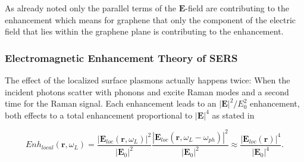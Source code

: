As already noted only the parallel terms of the $\mathbf{E}$-field are contributing to the enhancement which means for graphene that only the component of the electric field that lies within the graphene plane is contributing to the enhancement.

\subsubsection{Electromagnetic Enhancement Theory of SERS}

The effect of the localized surface plasmons actually happens twice: When the incident photons scatter with phonons and excite Raman modes and a second time for the Raman signal. Each enhancement leads to an $|\mathbf{E}|^2/E_0^2$ enhancement, both effects to a total enhancement proportional to $|\mathbf{E}|^4$ as stated in

\begin{equation}
  Enh_{local}(\mathbf{r},\omega_L)=\frac{\left|\mathbf{E}_{loc}(\mathbf{r}, \omega_L)\right|^2}{\left|\mathbf{E}_0\right|^2}\frac{\left|\mathbf{E}_{loc}(\mathbf{r}, \omega_L-\omega_{ph})\right|^2}{\left|\mathbf{E}_0\right|^2}\approx\frac{\left|\mathbf{E}_{loc}(\mathbf{r})\right|^4}{\left|\mathbf{E}_0\right|^4}.
  \label{eq:enhancement}
\end{equation}

